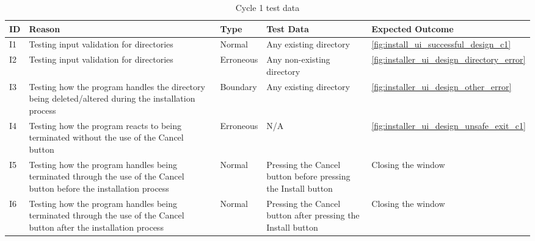 \documentclass[11pt]{article}
\begin{document}
        \newpage
        \begin{table}[!h]
            \centering
            \begin{tabular}{@{}lp{150pt}lp{87pt}l@{}} \toprule
                \textbf{ID} & \textbf{Reason} & \textbf{Type} & \textbf{Test Data} & \textbf{Expected Outcome} \\ \midrule
                I1 & Testing input validation for directories & Normal & Any existing directory & \autoref{fig:install_ui_successful_design_c1} \\ \medskip
                I2 & Testing input validation for directories & Erroneous & Any non-existing directory & \autoref{fig:installer_ui_design_directory_error} \\ \medskip
                I3 & Testing how the program handles the directory being deleted/altered during the installation process & Boundary & Any existing directory & \autoref{fig:installer_ui_design_other_error} \\ \medskip
                I4 & Testing how the program reacts to being terminated without the use of the Cancel button & Erroneous & N/A & \autoref{fig:installer_ui_design_unsafe_exit_c1} \\ \medskip
                I5 & Testing how the program handles being terminated through the use of the Cancel button before the installation process & Normal & Pressing the Cancel button before pressing the Install button & Closing the window \\ \medskip
                I6 & Testing how the program handles being terminated through the use of the Cancel button after the installation process & Normal & Pressing the Cancel button after pressing the Install button & Closing the window \\
                \bottomrule
            \end{tabular}
            \caption{Cycle 1 test data}
            \label{tbl:test_data_before_c1}
        \end{table}
\end{document}
